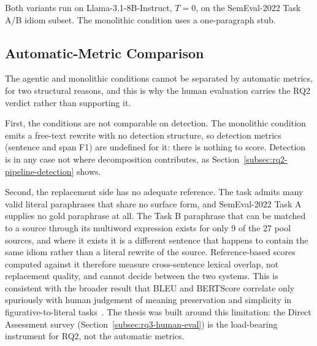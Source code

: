 Both variants run on Llama-3.1-8B-Instruct, $T=0$, on the SemEval-2022 Task A/B idiom subset. The monolithic condition uses a one-paragraph stub.

\subsection{Automatic-Metric Comparison}

The agentic and monolithic conditions cannot be separated by automatic metrics, for two structural reasons, and this is why the human evaluation carries the RQ2 verdict rather than supporting it.

First, the conditions are not comparable on detection. The monolithic condition emits a free-text rewrite with no detection structure, so detection metrics (sentence and span F1) are undefined for it: there is nothing to score. Detection is in any case not where decomposition contributes, as Section~\ref{subsec:rq2-pipeline-detection} shows.

Second, the replacement side has no adequate reference. The task admits many valid literal paraphrases that share no surface form, and SemEval-2022 Task A supplies no gold paraphrase at all. The Task B paraphrase that can be matched to a source through its multiword expression exists for only 9 of the 27 pool sources, and where it exists it is a different sentence that happens to contain the same idiom rather than a literal rewrite of the source. Reference-based scores computed against it therefore measure cross-sentence lexical overlap, not replacement quality, and cannot decide between the two systems. This is consistent with the broader result that BLEU and BERTScore correlate only spuriously with human judgement of meaning preservation and simplicity in figurative-to-literal tasks~\cite{Alva-Manchego2021,Scialom2021}. The thesis was built around this limitation: the Direct Assessment survey (Section~\ref{subsec:rq3-human-eval}) is the load-bearing instrument for RQ2, not the automatic metrics.

